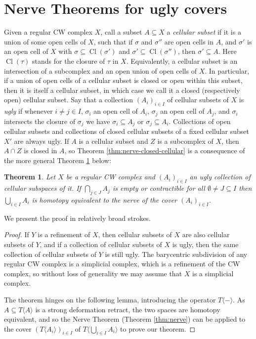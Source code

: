 \documentclass[a4paper,11pt,reqno, english]{amsart}
\newtheorem{theorem}{Theorem}[section]
\theoremstyle{definition}
\theoremstyle{remark}
\begin{document}
\appendix
\section{Nerve Theorems for ugly covers}\label{sec:nerve-thm-extension}

Given a regular CW complex $X$, call a subset $A\subseteq X$ a \emph{cellular subset} if it is a union of some open cells of $X$, such that if $\sigma$ and $\sigma''$ are open cells in $A$, and $\sigma'$ is an open cell of $X$ with $\sigma\subseteq\operatorname{Cl}(\sigma')$ and $\sigma'\subseteq\operatorname{Cl}(\sigma'')$, then $\sigma'\subseteq A$. Here $\operatorname{Cl}(\tau)$ stands for the closure of $\tau$ in $X$. Equivalently, a cellular subset is an intersection of a subcomplex and an open union of open cells of $X$. In particular, if a union of open cells of a cellular subset is closed or open within this subset, then it is itself a cellular subset, in which case we call it a closed (respectively open) cellular subset. Say that a collection $(A_i)_{i\in I}$ of cellular subsets of $X$ is \emph{ugly} if whenever $i\neq j\in I$, $\sigma_i$ an open cell of $A_i$, $\sigma_j$ an open cell of $A_j$, and $\sigma_i$ intersects the closure of $\sigma_j$ we have $\sigma_i\subseteq A_j$ or $\sigma_j\subseteq A_i$. Collections of open cellular subsets and collections of closed cellular subsets of a fixed cellular subset $X'$ are always ugly. If $A$ is a cellular subset and $Z$ is a subcomplex of $X$, then $A\cap Z$ is closed in $A$, so Theorem \ref{thm:nerve-closed-cellular} is a consequence of the more general Theorem \ref{thm:nerve-ugly-cellular} below:
\begin{theorem}\label{thm:nerve-ugly-cellular}
    Let $X$ be a regular CW complex and $(A_i)_{i\in I}$ an ugly collection of cellular subspaces of it. If $\bigcap_{j\in J}A_j$ is empty or contractible for all $\emptyset\neq J\subseteq I$ then $\bigcup_{i\in I}A_i$ is homotopy equivalent to the nerve of the cover $(A_i)_{i\in I}$.
\end{theorem}
We present the proof in relatively broad strokes.
\begin{proof}
    If $Y$ is a refinement of $X$, then cellular subsets of $X$ are also cellular subsets of $Y$, and if a collection of cellular subsets of $X$ is ugly, then the same collection of cellular subsets of $Y$ is still ugly. The barycentric subdivision of any regular CW complex is a simplicial complex, which is a refinement of the CW complex, so without loss of generality we may assume that $X$ is a simplicial complex.

    The theorem hinges on the following lemma, introducing the operator $T\langle -\rangle$. As $A\subseteq T\langle A\rangle$ is a strong deformation retract, the two spaces are homotopy equivalent, and so the Nerve Theorem (Theorem \ref{thm:nerve}) can be applied to the cover $(T\langle A_i\rangle)_{i\in I}$ of $T\langle\bigcup_{i\in I}A_i\rangle$ to prove our theorem.
\end{proof}
\end{document}
